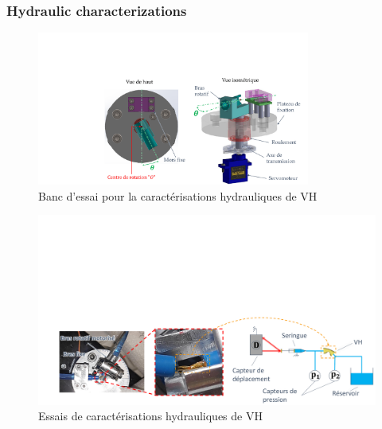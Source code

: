 \documentclass[3p,twocolumn,preprint]{elsarticle}
\begin{document}
			\subsubsection{Hydraulic characterizations}
			\label{Hydraulic characterizations}
\begin{figure}[!htb]
\begin{center}
	\captionsetup{justification=centering} 
	\includegraphics[trim={8cm 0cm 0cm 5cm},clip,width=0.8\textwidth]{figures/BDT_hydraulique_VH.pdf}
	\caption{Banc d'essai pour la caractérisations hydrauliques de VH}
	\label{fig:BDT_hydraulique_VH}
\end{center}	
\end{figure}    
\begin{figure}[!htb]
\begin{center}
	\captionsetup{justification=centering} 
	\includegraphics[trim={2cm 0cm 0cm 10cm},clip,width=\textwidth]{figures/essais_hydraulique_VH.pdf}
	\caption{Essais de caractérisations hydrauliques de VH}
	\label{fig:essais_hydraulique_VH}
\end{center}	
\end{figure}    
\end{document}
